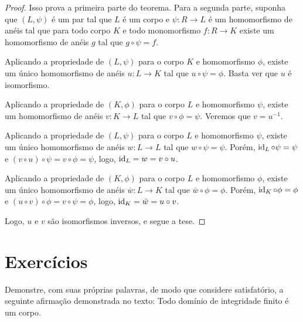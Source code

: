 \begin{proof}
    Isso prova a primeira parte do teorema.
    Para a segunda parte, suponha que $(L, \psi)$ é um par tal que $L$ é um corpo e $\psi:R\rightarrow L$ é um homomorfismo de anéis tal que para todo corpo $K$ e todo monomorfismo $f:R\rightarrow K$ existe um homomorfismo de anéis $g$ tal que $g\circ\psi=f$.

    Aplicando a propriedade de $(L, \psi)$ para o corpo $K$ e homomorfismo $\phi$, existe um único homomorfismo de anéis $u:L\rightarrow K$ tal que $u\circ \psi=\phi$.
    Basta ver que $u$ é isomorfismo.

    Aplicando a propriedade de $(K, \phi)$ para o corpo $L$ e homomorfismo $\psi$, existe um homomorfismo de anéis $v:K\rightarrow L$ tal que $v\circ \phi=\psi$.
    Veremos que $v=u^{-1}$.

    Aplicando a propriedade de $(L, \psi)$ para o corpo $L$ e homomorfismo $\psi$, existe um único homomorfismo de anéis $w:L\rightarrow L$ tal que $w\circ \psi=\psi$.
    Porém, $\operatorname{id}_L\circ \psi=\psi$ e $(v\circ u)\circ \psi=v\circ \phi=\psi$, logo, $\operatorname{id}_L=w=v\circ u$.

    Aplicando a propriedade de $(K, \phi)$ para o corpo $L$ e homomorfismo $\phi$, existe um único homomorfismo de anéis $\bar w:L\rightarrow K$ tal que $\bar w\circ \phi=\phi$.
    Porém, $\operatorname{id}_K\circ \phi=\phi$ e $(u\circ v)\circ \phi=v\circ \psi=\phi$, logo, $\operatorname{id}_K=\bar w=u\circ v$.

    Logo, $u$ e $v$ são isomorfismos inversos, e segue a tese.



\end{proof}
\section{Exercícios}
\begin{exer}
    Demonstre, com suas próprias palavras, de modo que considere satisfatório, a seguinte afirmação demonstrada no texto: Todo domínio de integridade finito é um corpo.
\end{exer}